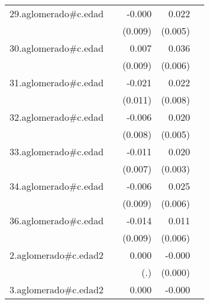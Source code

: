 {\begin{longtable}{l*{4}{D{.}{.}{-1}}}
\addlinespace
29.aglomerado#c.edad&                     &      -0.000         &       0.022\sym{***}&                     \\
            &                     &     (0.009)         &     (0.005)         &                     \\
\addlinespace
30.aglomerado#c.edad&                     &       0.007         &       0.036\sym{***}&                     \\
            &                     &     (0.009)         &     (0.006)         &                     \\
\addlinespace
31.aglomerado#c.edad&                     &      -0.021\sym{*}  &       0.022\sym{**} &                     \\
            &                     &     (0.011)         &     (0.008)         &                     \\
\addlinespace
32.aglomerado#c.edad&                     &      -0.006         &       0.020\sym{***}&                     \\
            &                     &     (0.008)         &     (0.005)         &                     \\
\addlinespace
33.aglomerado#c.edad&                     &      -0.011         &       0.020\sym{***}&                     \\
            &                     &     (0.007)         &     (0.003)         &                     \\
\addlinespace
34.aglomerado#c.edad&                     &      -0.006         &       0.025\sym{***}&                     \\
            &                     &     (0.009)         &     (0.006)         &                     \\
\addlinespace
36.aglomerado#c.edad&                     &      -0.014         &       0.011         &                     \\
            &                     &     (0.009)         &     (0.006)         &                     \\
\addlinespace
2.aglomerado#c.edad2&                     &       0.000         &      -0.000\sym{***}&                     \\
            &                     &         (.)         &     (0.000)         &                     \\
\addlinespace
3.aglomerado#c.edad2&                     &       0.000         &      -0.000\sym{***}&                     \\

\end{longtable}}

